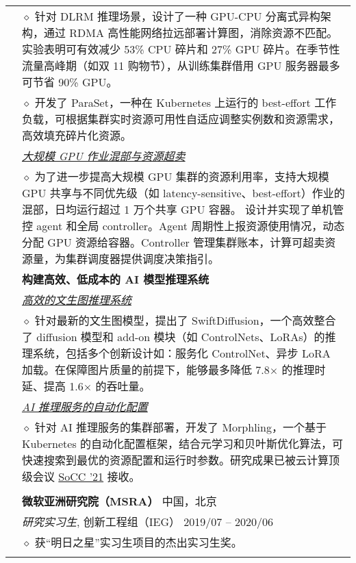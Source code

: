 \documentclass[letterpaper, 10pt]{article}
\begin{document}
\begin{longtable}{p{0.7in}p{6.0in}}
    & $\diamond$ 针对 DLRM 推理场景，设计了一种 GPU-CPU 分离式异构架构，通过 RDMA 高性能网络拉远部署计算图，消除资源不匹配。实验表明可有效减少 53\% CPU 碎片和 27\% GPU 碎片。在季节性流量高峰期（如双 11 购物节），从训练集群借用 GPU 服务器最多可节省 90\% GPU。 \\

    & $\diamond$ 开发了 ParaSet，一种在 Kubernetes 上运行的 best-effort 工作负载，可根据集群实时资源可用性自适应调整实例数和资源需求，高效填充碎片化资源。 \\

& \textit{\underline{大规模 GPU 作业混部与资源超卖}} \\
    & $\diamond$
    为了进一步提高大规模 GPU 集群的资源利用率，支持大规模 GPU 共享与不同优先级（如 latency-sensitive、best-effort）作业的混部，日均运行超过 1 万个共享 GPU 容器。
    设计并实现了单机管控 agent 和全局 controller。Agent 周期性上报资源使用情况，动态分配 GPU 资源给容器。Controller 管理集群账本，计算可超卖资源量，为集群调度器提供调度决策指引。
    \\

& \textbf{构建高效、低成本的 AI 模型推理系统} \\

& \textit{\underline{高效的文生图推理系统}} \\

    & $\diamond$ 针对最新的文生图模型，提出了 SwiftDiffusion，一个高效整合了 diffusion 模型和 add-on 模块（如 ControlNets、LoRAs）的推理系统，包括多个创新设计如：服务化 ControlNet、异步 LoRA 加载。在保障图片质量的前提下，能够最多降低 7.8$\times$ 的推理时延、提高 1.6$\times$ 的吞吐量。 \\

& \textit{\underline{AI 推理服务的自动化配置}} \\

    & $\diamond$ 针对 AI 推理服务的集群部署，开发了 Morphling，一个基于 Kubernetes 的自动化配置框架，结合元学习和贝叶斯优化算法，可快速搜索到最优的资源配置和运行时参数。研究成果已被云计算顶级会议 \underline{SoCC '21} 接收。 \\
& \\

& {\textbf{微软亚洲研究院（MSRA）}} \hfill 中国，北京 \\
& \textit{研究实习生}, 创新工程组（IEG） \hfill 2019/07 -- 2020/06 \\
& $\diamond$ 获“明日之星”实习生项目的杰出实习生奖。 \\
& \\


\end{longtable}
\end{document}
